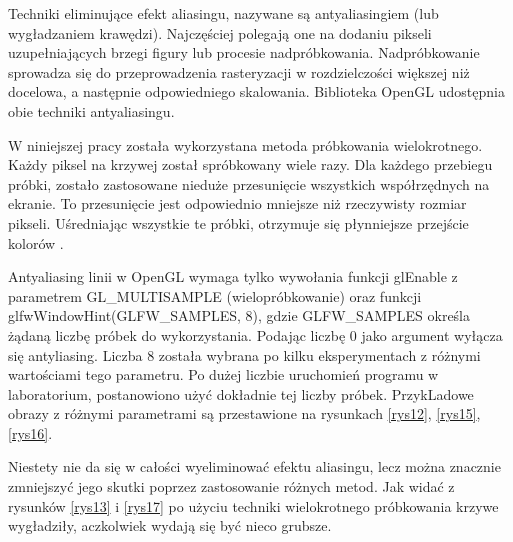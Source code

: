 Techniki eliminujące efekt aliasingu, nazywane są antyaliasingiem (lub wygładzaniem krawędzi). Najczęściej polegają one na dodaniu pikseli uzupełniających brzegi figury lub procesie nadpróbkowania. Nadpróbkowanie sprowadza się do przeprowadzenia rasteryzacji w rozdzielczości większej niż docelowa, a następnie odpowiedniego skalowania. Biblioteka OpenGL udostępnia obie techniki antyaliasingu. 

W niniejszej pracy została wykorzystana metoda próbkowania wielokrotnego. Każdy piksel na krzywej został spróbkowany wiele razy. Dla każdego przebiegu próbki, zostało zastosowane nieduże przesunięcie wszystkich współrzędnych na ekranie. To przesunięcie jest odpowiednio mniejsze niż rzeczywisty rozmiar pikseli. Uśredniając wszystkie te próbki, otrzymuje się płynniejsze przejście kolorów \cite{glfw}. 

Antyaliasing linii w OpenGL wymaga tylko wywołania funkcji glEnable z parametrem GL\_MULTISAMPLE (wielopróbkowanie) oraz funkcji glfwWindowHint(GLFW\_SAMPLES, 8), gdzie GLFW\_SAMPLES określa żądaną liczbę próbek do wykorzystania. Podając liczbę 0 jako argument wyłącza się antyliasing. Liczba 8 została wybrana po kilku eksperymentach z różnymi wartościami tego parametru. Po dużej liczbie uruchomień programu w laboratorium, postanowiono użyć dokładnie tej liczby próbek. PrzykLadowe obrazy z różnymi parametrami są przestawione na rysunkach \ref{rys12}, \ref{rys15}, \ref{rys16}.

Niestety nie da się w całości wyeliminować efektu aliasingu, lecz można znacznie zmniejszyć jego skutki poprzez zastosowanie różnych metod. Jak widać z rysunków \ref{rys13} i \ref{rys17} po użyciu techniki wielokrotnego próbkowania krzywe wygładziły, aczkolwiek wydają się być nieco grubsze.

